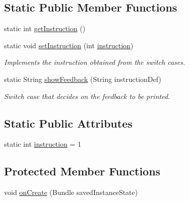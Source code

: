 \subsection*{Static Public Member Functions}
\begin{DoxyCompactItemize}
\item 
static int \mbox{\hyperlink{classcom_1_1example_1_1trainawearapplication_1_1_classic_squat_ab2575cf1007e1d844a98e511b93aaf8d}{get\+Instruction}} ()
\item 
static void \mbox{\hyperlink{classcom_1_1example_1_1trainawearapplication_1_1_classic_squat_a3a096fd4064cf28568fd13336c77d28f}{set\+Instruction}} (int \mbox{\hyperlink{classcom_1_1example_1_1trainawearapplication_1_1_classic_squat_a3cbf1db0a5560d931ebdaa407a1a6285}{instruction}})
\begin{DoxyCompactList}\small\item\em Implements the instruction obtained from the switch cases. \end{DoxyCompactList}\item 
static String \mbox{\hyperlink{classcom_1_1example_1_1trainawearapplication_1_1_classic_squat_a1904cfcfcc9d0e3f1256202a8f7ad33e}{show\+Feedback}} (String instruction\+Def)
\begin{DoxyCompactList}\small\item\em Switch case that decides on the feedback to be printed. \end{DoxyCompactList}\end{DoxyCompactItemize}
\subsection*{Static Public Attributes}
\begin{DoxyCompactItemize}
\item 
static int \mbox{\hyperlink{classcom_1_1example_1_1trainawearapplication_1_1_classic_squat_a3cbf1db0a5560d931ebdaa407a1a6285}{instruction}} = 1
\end{DoxyCompactItemize}
\subsection*{Protected Member Functions}
\begin{DoxyCompactItemize}
\item 
void \mbox{\hyperlink{classcom_1_1example_1_1trainawearapplication_1_1_classic_squat_afa5582341ba5a9609e4eb7d539741e6a}{on\+Create}} (Bundle saved\+Instance\+State)
\end{DoxyCompactItemize}
